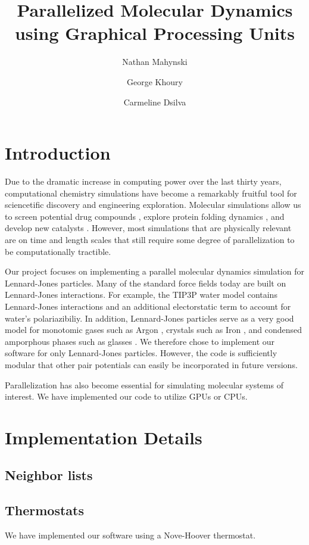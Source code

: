 \documentclass[12pt]{article}
\title{Parallelized Molecular Dynamics using Graphical Processing Units}
\author{Nathan Mahynski \and George Khoury \and Carmeline Dsilva}
\begin{document}
\maketitle

\section{Introduction}

Due to the dramatic increase in computing power over the last thirty years, computational chemistry simulations have become a remarkably fruitful tool for sciencetific discovery and engineering exploration.
%
Molecular simulations allow us to screen potential drug compounds \cite{...}, explore protein folding dynamics \cite{...}, and develop new catalysts \cite{...}.
%
However, most simulations that are physically relevant are on time and length scales that still require some degree of parallelization to be computationally tractible.

Our project focuses on implementing a parallel molecular dynamics simulation for Lennard-Jones particles.
%
Many of the standard force fields today are built on Lennard-Jones interactions.
%
For example, the TIP3P water model \cite{...} contains Lennard-Jones interactions and an additional electorstatic term to account for water's polariazibiliy.
%
In addition, Lennard-Jones particles serve as a very good model for monotomic gases such as Argon \cite{...}, crystals such as Iron \cite{...}, and condensed amporphous phases such as glasses \cite{...}.
%
We therefore chose to implement our software for only Lennard-Jones particles.
%
However, the code is sufficiently modular that other pair potentials can easily be incorporated in future versions.

Parallelization has also become essential for simulating molecular systems of interest. 
%
We have implemented our code to utilize GPUs or CPUs.


\section{Implementation Details}

\subsection{Neighbor lists}

\subsection{Thermostats}
We have implemented our software using a Nove-Hoover thermostat.
%
\end{document}
